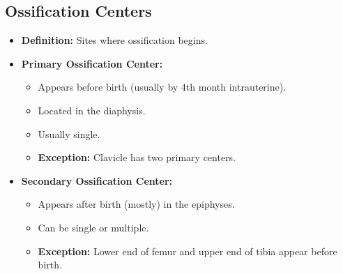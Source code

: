 \documentclass[11pt]{article}
\begin{document}
\subsection{Ossification Centers}
\begin{itemize}
    \item \textbf{Definition:} Sites where ossification begins.
    \item \textbf{Primary Ossification Center:}
    \begin{itemize}
        \item Appears before birth (usually by 4th month intrauterine).
        \item Located in the diaphysis.
        \item Usually single.
        \item \textbf{Exception:} Clavicle has two primary centers.
    \end{itemize}
    \item \textbf{Secondary Ossification Center:}
    \begin{itemize}
        \item Appears after birth (mostly) in the epiphyses.
        \item Can be single or multiple.
        \item \textbf{Exception:} Lower end of femur and upper end of tibia appear before birth.
    \end{itemize}
\end{itemize}
\end{document}
